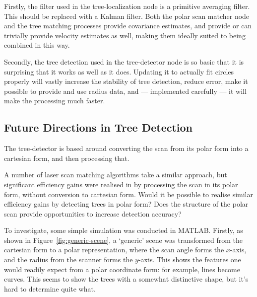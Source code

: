 \documentclass[12pt,oneside,a4paper]{book}
\begin{document}
Firstly, the filter used in the tree-localization node is a primitive
averaging filter. This should be replaced with a Kalman
filter. Both the polar scan matcher node and the tree matching
processes provide covariance estimates, and provide or can trivially
provide velocity estimates as well, making them ideally suited to
being combined in this way.

Secondly, the tree detection used in the tree-detector node is so
basic that it is surprising that it works as well as it does. Updating
it to actually fit circles properly will vastly increase the stability
of tree detection, reduce error, make it possible to provide and use
radius data, and --- implemented carefully --- it will make the
processing much faster.

\subsection{Future Directions in Tree Detection}
\label{sec:future-direct-tree}

The tree-detector is based around converting the scan from its polar
form into a cartesian form, and then processing that.

A number of laser scan matching algorithms take a similar approach,
but significant efficiency gains were realised in
\cite{polarscanmatching} by processing the scan in its polar form,
without conversion to cartesian form. Would it be possible to realise
similar efficiency gains by detecting trees in polar form? Does the
structure of the polar scan provide opportunities to increase
detection accuracy?

To investigate, some simple simulation was conducted in MATLAB. 
\newpage
Firstly, as shown in Figure~\ref{fig:generic-scene}, a `generic' scene
was transformed from the cartesian form to a polar representation,
where the scan angle forms the $x$-axis, and the radius from the
scanner forms the $y$-axis. This shows the features one would readily
expect from a polar coordinate form: for example, lines become
curves. This seems to show the trees with a somewhat distinctive
shape, but it's hard to determine quite what.
\end{document}
